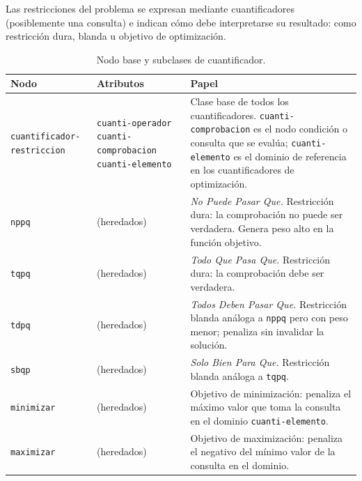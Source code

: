 \documentclass[12pt,a4paper]{report}
\begin{document}
Las restricciones del problema se expresan mediante cuantificadores  (posiblemente una consulta) e indican cómo
debe interpretarse su resultado: como restricción dura, blanda u objetivo
de optimización.


\begin{table}[h!]
\centering
\caption{Nodo base y subclases de cuantificador.}
\label{tab:cuantificadores}
\renewcommand{\arraystretch}{1.3}
\begin{tabular}{p{4.8cm} p{4.5cm} p{5.5cm}}
\hline
\textbf{Nodo} & \textbf{Atributos} & \textbf{Papel} \\
\hline
\texttt{cuantificador-restriccion}
  & \texttt{cuanti-operador}\newline
    \texttt{cuanti-comprobacion}\newline
    \texttt{cuanti-elemento}
  & Clase base de todos los cuantificadores.
    \texttt{cuanti-comprobacion} es el nodo condición o consulta
    que se evalúa; \texttt{cuanti-elemento} es el dominio de
    referencia en los cuantificadores de optimización. \\
\hline
\texttt{nppq}
  & (heredados)
  & \emph{No Puede Pasar Que.} Restricción dura: la comprobación
    no puede ser verdadera.  Genera peso alto en la función
    objetivo. \\
\hline
\texttt{tqpq}
  & (heredados)
  & \emph{Todo Que Pasa Que.} Restricción dura: la comprobación
    debe ser verdadera. \\
\hline
\texttt{tdpq}
  & (heredados)
  & \emph{Todos Deben Pasar Que.} Restricción blanda análoga a
    \texttt{nppq} pero con peso menor; penaliza sin invalidar
    la solución. \\
\hline
\texttt{sbqp}
  & (heredados)
  & \emph{Solo Bien Para Que.} Restricción blanda análoga a
    \texttt{tqpq}. \\
\hline
\texttt{minimizar}
  & (heredados)
  & Objetivo de minimización: penaliza el máximo valor que toma
    la consulta en el dominio \texttt{cuanti-elemento}. \\
\hline
\texttt{maximizar}
  & (heredados)
  & Objetivo de maximización: penaliza el negativo del mínimo
    valor de la consulta en el dominio. \\
\hline
\end{tabular}
\end{table}

\end{document}
